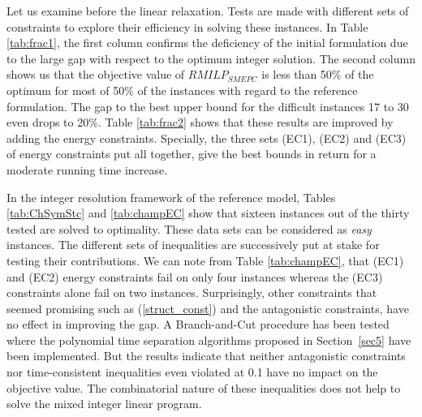 \documentclass[11pt]{article}
\theoremstyle{plain}%
\theoremstyle{definition} \newtheorem{lem}{Lemma}[section]
\theoremstyle{definition} \newtheorem{claim}{Claim}[lem]
\theoremstyle{definition} \newtheorem{theorem}{Theorem}[section]
\theoremstyle{definition} \newtheorem{exo}{Exercice n$^\circ$}
\theoremstyle{definition} \newtheorem{quest}{}[exo]
\theoremstyle{definition} \newtheorem{sousquest}{}[quest]
\theoremstyle{remark}
\theoremstyle{definition}
\begin{document}


Let us examine before the linear relaxation. Tests are made with different sets of constraints to explore their efficiency in solving these instances.
In Table \ref{tab:frac1}, the first column confirms the deficiency of the initial formulation
due to the large gap with respect to the optimum integer solution. The second column shows us that the objective  value of $RMILP_{SMEPC}$ is less than 50\% of the optimum for most  of 50\% of the instances with regard to the reference formulation. The gap to the best upper bound for the difficult instances 17 to 30 even drops to 20\%. 
Table  \ref{tab:frac2} shows that these results are improved by adding the energy constraints. Specially, the  three sets (EC1), (EC2) and (EC3) of energy constraints put all together, give the best bounds in return for a moderate running time increase.

In the integer resolution  framework of the reference model, 
Tables \ref{tab:ChSymStc} and \ref{tab:champEC} show that sixteen instances out of the thirty tested are solved to optimality. These data sets can be considered  as  {\it easy }instances. The different sets of inequalities are successively put at stake  for testing their contributions.
We can note from Table \ref{tab:champEC}, that (EC1) and (EC2) energy constraints fail on only four instances whereas  the (EC3) constraints alone fail on two instances. 
Surprisingly, other constraints that seemed promising such as (\ref{struct_const}) and the antagonistic constraints, have no effect in improving the gap. A Branch-and-Cut procedure has been tested where the polynomial time separation algorithms proposed in Section~\ref{sec5} have been  implemented. 
But the results indicate that neither antagonistic  constraints nor time-consistent inequalities even violated at 0.1 have no impact on the objective value. The combinatorial nature of these inequalities does not help to solve the mixed integer linear program.

\end{document}
